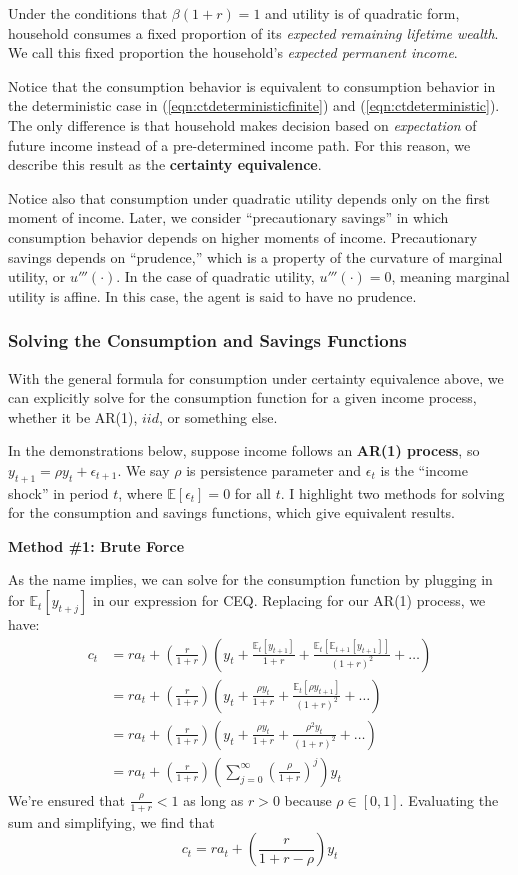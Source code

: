 \documentclass[11pt]{article}
\newcommand{\expectation}{\mathbb{E}}
\begin{document}
Under the conditions that $\beta(1+r)=1$ and utility is of quadratic form, household consumes a fixed proportion of its \emph{expected remaining lifetime wealth}. We call this fixed proportion the household's \emph{expected permanent income}.

Notice that the consumption behavior is equivalent to consumption behavior in the deterministic case in (\ref{eqn:ctdeterministicfinite}) and (\ref{eqn:ctdeterministic}). The only difference is that household makes decision based on \emph{expectation} of future income instead of a pre-determined income path. For this reason, we describe this result as the \textbf{certainty equivalence}. 

Notice also that consumption under quadratic utility depends only on the first moment of income. Later, we consider ``precautionary savings'' in which consumption behavior depends on higher moments of income. Precautionary savings depends on ``prudence,'' which is a property of the curvature of marginal utility, or $u'''(\cdot)$. In the case of quadratic utility, $u'''(\cdot) = 0$, meaning marginal utility is affine. In this case, the agent is said to have no prudence.

\subsubsection{Solving the Consumption and Savings Functions}
With the general formula for consumption under certainty equivalence above, we can explicitly solve for the consumption function for a given income process, whether it be AR(1), $iid$, or something else. 

In the demonstrations below, suppose income follows an \textbf{AR(1) process}, so $y_{t+1} = \rho y_t + \epsilon_{t+1}$. We say $\rho$ is persistence parameter and $\epsilon_t$ is the ``income shock'' in period $t$, where $\expectation[\epsilon_t] = 0$ for all $t$. I highlight two methods for solving for the consumption and savings functions, which give equivalent results.

\noindent
\textbf{Method \#1: Brute Force}

As the name implies, we can solve for the consumption function by plugging in for $\expectation_t[y_{t+j}]$ in our expression for CEQ. Replacing for our AR(1) process, we have:
\begin{align*}
    c_t &= r a_t + \left(\frac{r}{1+r}\right)\left(y_t + \frac{\expectation_t[y_{t+1}]}{1+r} + \frac{\expectation_t[\expectation_{t+1}[y_{t+1}]]}{(1+r)^2} + \dots \right) \\
    &= r a_t + \left(\frac{r}{1+r}\right)\left(y_t + \frac{\rho y_t}{1+r} + \frac{\expectation_t[\rho y_{t+1}]}{(1+r)^2} + \dots \right) \\
    &= r a_t + \left(\frac{r}{1+r}\right)\left(y_t + \frac{\rho y_t}{1+r} + \frac{\rho^2 y_t}{(1+r)^2} + \dots \right) \\
    &= r a_t + \left(\frac{r}{1+r}\right)\left(\sum_{j=0}^\infty \left(\frac{\rho}{1+r}\right)^j\right)y_t
\end{align*}
We're ensured that $\frac{\rho}{1+r} < 1$ as long as $r > 0$ because $\rho \in [0,1]$. Evaluating the sum and simplifying, we find that $$c_t = ra_t + \left(\frac{r}{1+r-\rho}\right) y_t$$
\end{document}
